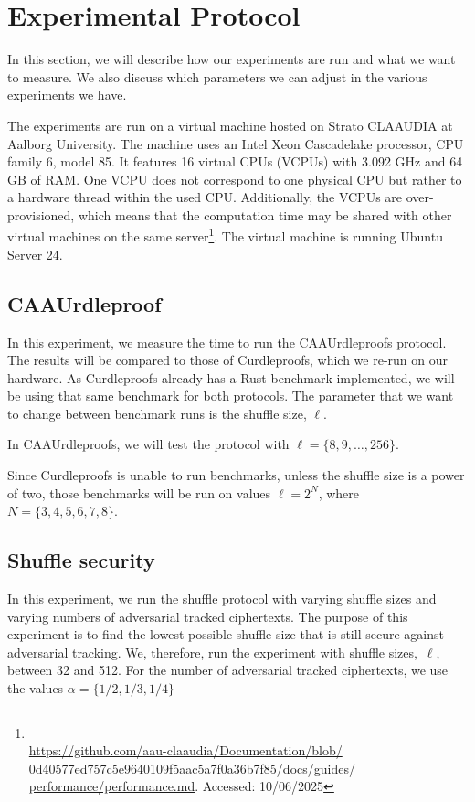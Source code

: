 
\section{Experimental Protocol}\label{sec:experimental-protocol}
In this section, we will describe how our experiments are run and what we want to measure.
We also discuss which parameters we can adjust in the various experiments we have.

The experiments are run on a virtual machine hosted on Strato CLAAUDIA at Aalborg University.
The machine uses an Intel Xeon Cascadelake processor, CPU family 6, model 85.
It features 16 virtual CPUs (VCPUs) with 3.092 GHz and 64 GB of RAM\@.
One VCPU does not correspond to one physical CPU but rather to a hardware thread within the used CPU\@.
Additionally, the VCPUs are over-provisioned, which means that the computation time may be shared with other virtual machines on the same server\footnote{\\ \href{https://github.com/aau-claaudia/Documentation/blob/0d40577ed757c5e9640109f5aac5a7f0a36b7f85/docs/guides/performance/performance.md}{https://github.com/aau-claaudia/Documentation/blob/\\0d40577ed757c5e9640109f5aac5a7f0a36b7f85/docs/guides/\\performance/performance.md}. Accessed: 10/06/2025}.
The virtual machine is running Ubuntu Server 24.


\subsection{CAAUrdleproof}\label{sec:CAAUrdleproof-experiment}
In this experiment, we measure the time to run the CAAUrdleproofs protocol.
The results will be compared to those of Curdleproofs, which we re-run on our hardware.
As Curdleproofs already has a Rust benchmark implemented, we will be using that same benchmark for both protocols.
The parameter that we want to change between benchmark runs is the shuffle size, $\ell$.

In CAAUrdleproofs, we will test the protocol with $\ell=\{8,9,\dots,256\}$.

Since Curdleproofs is unable to run benchmarks, unless the shuffle size is a power of two, those benchmarks will be run on values $\ell=2^N$, where $N=\{3,4,5,6,7,8\}$.




\subsection{Shuffle security}\label{subsec:experimental-protocol-shuffle-security}
In this experiment, we run the shuffle protocol with varying shuffle sizes and varying numbers of adversarial tracked ciphertexts.
The purpose of this experiment is to find the lowest possible shuffle size that is still secure against adversarial tracking.
We, therefore, run the experiment with shuffle sizes,~$\ell$, between 32 and 512.
For the number of adversarial tracked ciphertexts, we use the values $\alpha=\{1/2,1/3,1/4\}$

